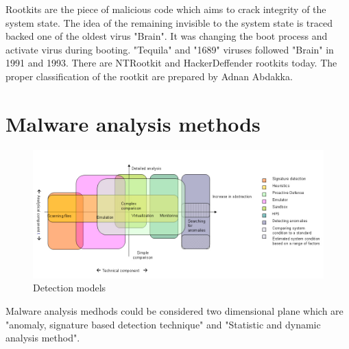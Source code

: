 Rootkits are the piece of malicious code which aims to crack integrity of the system state. The idea of the remaining invisible to the system state is traced backed one of the oldest virus "Brain"\cite{martin2008}. It was changing the boot process and activate virus during booting. "Tequila" and "1689" viruses followed "Brain" in 1991 and 1993\cite{Ducklin1991}. There are NTRootkit and HackerDeffender rootkits today. The proper classification of the rootkit are prepared by Adnan Abdakka\cite{Adnan2011}.



\section{Malware analysis methods}

\begin{figure}[h]
    \centering
    \includegraphics[width=1\textwidth]{alisa_1007_pic1_en.jpg}
    \caption{Detection models \cite{Shevchenko2007detc}}
    \label{fig:awesome_image}
\end{figure}
Malware analysis medhods could be considered two dimensional plane which are "anomaly, signature based detection technique" and "Statistic and dynamic analysis method". 



